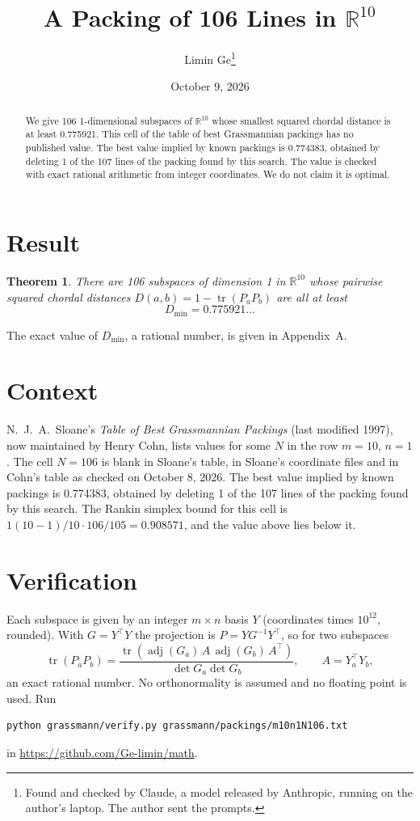 \documentclass[11pt,a4paper]{article}
\title{A Packing of 106 Lines in $\mathbb{R}^{10}$}
\author{Limin Ge\thanks{Found and checked by Claude, a model released by Anthropic, running on the author's laptop. The author sent the prompts.}}
\date{October 9, 2026}
\newtheorem*{theorem}{Theorem}
\begin{document}
\maketitle
\begin{abstract}
We give 106 1-dimensional subspaces of $\mathbb{R}^{10}$ whose smallest squared chordal distance is at least 0.775921. This cell of the table of best Grassmannian packings has no published value. The best value implied by known packings is 0.774383, obtained by deleting 1 of the 107 lines of the packing found by this search. The value is checked with exact rational arithmetic from integer coordinates. We do not claim it is optimal.
\end{abstract}

\section{Result}
\begin{theorem}
There are 106 subspaces of dimension 1 in $\mathbb{R}^{10}$ whose pairwise squared chordal distances $D(a,b) = 1 - \operatorname{tr}(P_aP_b)$ are all at least
\[ D_{\min} = 0.775921\ldots \]
\end{theorem}
The exact value of $D_{\min}$, a rational number, is given in Appendix~A.


\section{Context}
N.~J.~A.~Sloane's \emph{Table of Best Grassmannian Packings} (last modified 1997), now maintained by Henry Cohn, lists values for some $N$ in the row $m=10$, $n=1$. The cell $N=106$ is blank in Sloane's table, in Sloane's coordinate files and in Cohn's table as checked on October 8, 2026. The best value implied by known packings is 0.774383, obtained by deleting 1 of the 107 lines of the packing found by this search. The Rankin simplex bound for this cell is $1(10-1)/10\cdot 106/105 = 0.908571$, and the value above lies below it.


\section{Verification}
Each subspace is given by an integer $m\times n$ basis $Y$ (coordinates times $10^{12}$, rounded). With $G=Y^\top Y$ the projection is $P=YG^{-1}Y^\top$, so for two subspaces
\[ \operatorname{tr}(P_aP_b)=\frac{\operatorname{tr}(\operatorname{adj}(G_a)\,A\,\operatorname{adj}(G_b)\,A^\top)}{\det G_a\det G_b},\qquad A=Y_a^\top Y_b, \]
an exact rational number. No orthonormality is assumed and no floating point is used. Run
\begin{verbatim}
python grassmann/verify.py grassmann/packings/m10n1N106.txt
\end{verbatim}
in \url{https://github.com/Ge-limin/math}.
\end{document}
